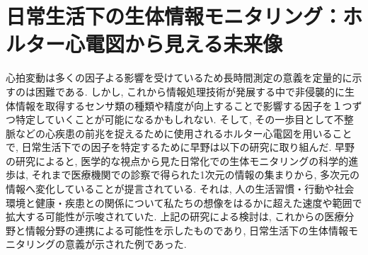 \documentclass[report, 11pt, a4paper]{jsbook}
\begin{document}
\section{日常生活下の生体情報モニタリング：ホルター心電図から見える未来像}
心拍変動は多くの因子よる影響を受けているため長時間測定の意義を定量的に示すのは困難である. しかし, これから情報処理技術が発展する中で非侵襲的に生体情報を取得するセンサ類の種類や精度が向上することで影響する因子を１つずつ特定していくことが可能になるかもしれない. そして, その一歩目として不整脈などの心疾患の前兆を捉えるために使用されるホルター心電図を用いることで, 日常生活下での因子を特定するために早野は以下の研究に取り組んだ. 
早野の研究によると, 医学的な視点から見た日常化での生体モニタリングの科学的進歩は, それまで医療機関での診察で得られた1次元の情報の集まりから, 多次元の情報へ変化していることが提言されている. それは, 人の生活習慣・行動や社会環境と健康・疾患との関係について私たちの想像をはるかに超えた速度や範囲で拡大する可能性が示唆されていた. 上記の研究による検討は, これからの医療分野と情報分野の連携による可能性を示したものであり, 日常生活下の生体情報モニタリングの意義が示された例であった.
\end{document}
